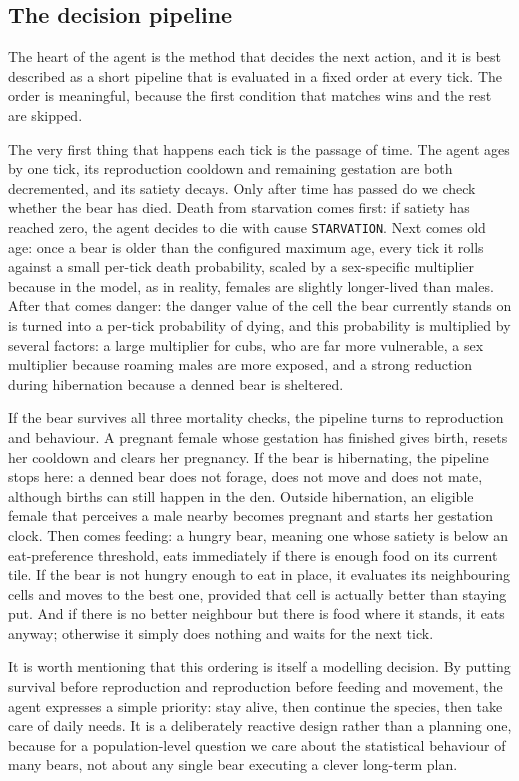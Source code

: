 \subsection{The decision pipeline}

The heart of the agent is the method that decides the next action, and it is best described as a short pipeline that is evaluated in a fixed order at every tick. The order is meaningful, because the first condition that matches wins and the rest are skipped.

The very first thing that happens each tick is the passage of time. The agent ages by one tick, its reproduction cooldown and remaining gestation are both decremented, and its satiety decays. Only after time has passed do we check whether the bear has died. Death from starvation comes first: if satiety has reached zero, the agent decides to die with cause \texttt{STARVATION}. Next comes old age: once a bear is older than the configured maximum age, every tick it rolls against a small per-tick death probability, scaled by a sex-specific multiplier because in the model, as in reality, females are slightly longer-lived than males. After that comes danger: the danger value of the cell the bear currently stands on is turned into a per-tick probability of dying, and this probability is multiplied by several factors: a large multiplier for cubs, who are far more vulnerable, a sex multiplier because roaming males are more exposed, and a strong reduction during hibernation because a denned bear is sheltered.

If the bear survives all three mortality checks, the pipeline turns to reproduction and behaviour. A pregnant female whose gestation has finished gives birth, resets her cooldown and clears her pregnancy. If the bear is hibernating, the pipeline stops here: a denned bear does not forage, does not move and does not mate, although births can still happen in the den. Outside hibernation, an eligible female that perceives a male nearby becomes pregnant and starts her gestation clock. Then comes feeding: a hungry bear, meaning one whose satiety is below an eat-preference threshold, eats immediately if there is enough food on its current tile. If the bear is not hungry enough to eat in place, it evaluates its neighbouring cells and moves to the best one, provided that cell is actually better than staying put. And if there is no better neighbour but there is food where it stands, it eats anyway; otherwise it simply does nothing and waits for the next tick.

It is worth mentioning that this ordering is itself a modelling decision. By putting survival before reproduction and reproduction before feeding and movement, the agent expresses a simple priority: stay alive, then continue the species, then take care of daily needs. It is a deliberately reactive design rather than a planning one, because for a population-level question we care about the statistical behaviour of many bears, not about any single bear executing a clever long-term plan.

